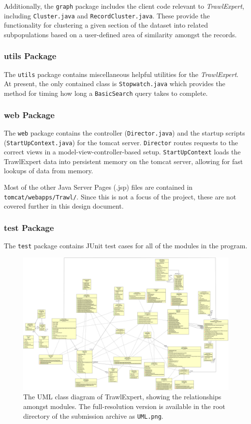 \documentclass{article}
\begin{document}
Additionally, the \texttt{graph} package includes the client code relevant to \textit{TrawlExpert}, including \texttt{Cluster.java} and \texttt{RecordCluster.java}. These provide the functionality for clustering a given section of the dataset into related subpopulations based on a user-defined area of similarity amongst the records.

\subsubsection{utils Package}
The \texttt{utils} package contains miscellaneous helpful utilities for the \textit{TrawlExpert}. At present, the only contained class is \texttt{Stopwatch.java} which provides the method for timing how long a \texttt{BasicSearch} query takes to complete.

\subsubsection{web Package}
The \texttt{web} package contains the controller (\texttt{Director.java}) and the startup scripts (\texttt{StartUpContext.java}) for the tomcat server. \texttt{Director} routes requests to the correct views in a model-view-controller-based setup. \texttt{StartUpContext} loads the TrawlExpert data into persistent memory on the tomcat server, allowing for fast lookups of data from memory. 

Most of the other Java Server Pages (.jsp) files are contained in \texttt{tomcat/webapps/Trawl/}. Since this is not a focus of the project, these are not covered further in this design document.

\subsubsection{test Package}
The \texttt{test} package contains JUnit test cases for all of the modules in the program.

\begin{figure}
\centering
\includegraphics[angle=90,width=14cm]{../UML.png}
\caption{The UML class diagram of TrawlExpert, showing the relationships amongst modules. The full-resolution version is available in the root directory of the submission archive as \texttt{UML.png}.}
\label{fig:UML}
\end{figure}
\end{document}
